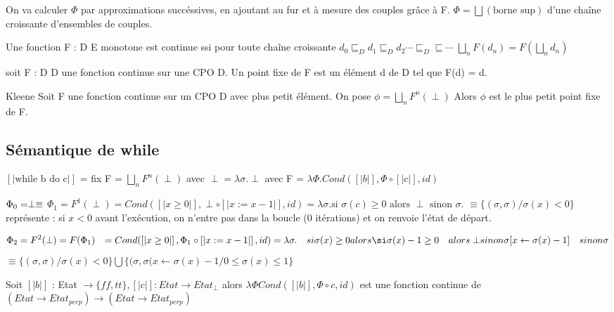 \documentclass[10pt,a4paper]{article}
\newcommand{\sem}[1]{$\left[| #1 | \right]$}
\newcommand{\semm}[1]{\left[| #1 | \right]}
\begin{document}
On va calculer $\Phi$ par approximations succéssives, en ajoutant au fur et à mesure des couples grâce à F.
$\Phi = \bigsqcup (\text{borne sup})$ d'une chaîne croissante d'ensembles de couples.

\begin{definition}{} Une fonction F : D \to E monotone est continue ssi pour toute chaîne croissante $d_0 \sqsubseteq_D d_1 \sqsubseteq_D d_2 \cdots  \sqsubseteq_D \sqsubseteq \cdots $
$\bigsqcup_n F (d_n) = F( \bigsqcup_n d_n)$
\end{definition}

\begin{definition}{}
 soit F : D \to D une fonction continue sur une CPO D.
 Un point fixe de F est un élément d de D tel que F(d) = d.
\end{definition}

\begin{thm}{Kleene}
 Soit F une fonction continue sur un CPO D avec plus petit élément. On pose 
 $\phi = \bigsqcup_n F^n(\perp)$
Alors $\phi$ est le plus petit point fixe de F.
\end{thm}

\subsection{Sémantique de while}
\sem{\text{while b do c}} = fix F = $\bigsqcup_n F^n(\perp)$ avec $\perp = \lambda \sigma. \perp$
avec F = $\lambda \Phi . Cond( \semm{b}, \Phi \circ \semm{c}, id)$

$\Phi_0 = \perp \equiv \empty$
$\Phi_1 = F^1(\perp) = Cond( \semm{x \geq 0}, \perp \circ \semm{x :=x -1}, id) = \lambda \sigma. \text{si }\sigma(c) \geq 0\text{ alors } \perp \text{ sinon } \sigma.$
$\equiv \{ (\sigma, \sigma) / \sigma(x) < 0 \}$
représente : si $x < 0$ avant l'exécution, on n'entre pas dans la boucle (0 itérations) et on renvoie l'état de départ.

\begin{align}
\Phi_2 = F^2(\perp) & = F(\Phi_1)
		    & = Cond( \semm{x \geq 0}, \Phi_1 \circ \semm{x :=x -1}, id)
		    & = \lambda \sigma. & si \sigma(x) \geq 0 
				        & alors \si \sigma(x) -1 \geq 0 & alors \perp
									& sinon \sigma[x \leftarrow \sigma(x) -1]
					& sinon \sigma
\end{align}
$\equiv \{(\sigma, \sigma) / \sigma(x) < 0 \} \bigcup \{(\sigma, \sigma(x \leftarrow \sigma(x)-1 / 0 \leq \sigma(x) \leq 1 \}$

\begin{thm}{} Soit \sem{b} : Etat $\to \{ff, tt \}, \semm{c} : Etat \to Etat_{\perp}$
alors $\lambda \Phi Cond( \semm{b}, \Phi \circ c, id)$ est une fonction continue de $(Etat \to Etat_{perp}) \to (Etat \to Etat_{perp})$
\end{thm}
\end{document}
